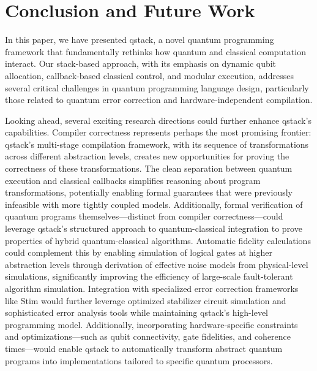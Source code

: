\section{Conclusion and Future Work}\label{sec:conclusion}

In this paper, we have presented qstack, a novel quantum programming framework that fundamentally rethinks how quantum and classical computation interact. Our stack-based approach, with its emphasis on dynamic qubit allocation, callback-based classical control, and modular execution, addresses several critical challenges in quantum programming language design, particularly those related to quantum error correction and hardware-independent compilation.

Looking ahead, several exciting research directions could further enhance qstack's capabilities. Compiler correctness represents perhaps the most promising frontier: qstack's multi-stage compilation framework, with its sequence of transformations across different abstraction levels, creates new opportunities for proving the correctness of these transformations. The clean separation between quantum execution and classical callbacks simplifies reasoning about program transformations, potentially enabling formal guarantees that were previously infeasible with more tightly coupled models. Additionally, formal verification of quantum programs themselves—distinct from compiler correctness—could leverage qstack's structured approach to quantum-classical integration to prove properties of hybrid quantum-classical algorithms. Automatic fidelity calculations could complement this by enabling simulation of logical gates at higher abstraction levels through derivation of effective noise models from physical-level simulations, significantly improving the efficiency of large-scale fault-tolerant algorithm simulation. Integration with specialized error correction frameworks like Stim would further leverage optimized stabilizer circuit simulation and sophisticated error analysis tools while maintaining qstack's high-level programming model. Additionally, incorporating hardware-specific constraints and optimizations—such as qubit connectivity, gate fidelities, and coherence times—would enable qstack to automatically transform abstract quantum programs into implementations tailored to specific quantum processors.

